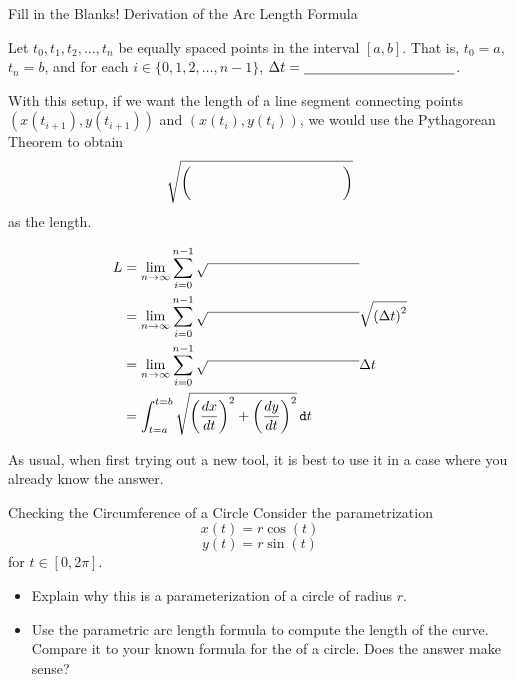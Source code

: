 \begin{exercise}{Fill in the Blanks!  Derivation of the Arc Length Formula \Coffeecup \Coffeecup}

Let $t_0,t_1,t_2,\ldots,t_n$ be equally spaced points in the interval $[a,b]$.  That is, $t_0=a$, $t_n=b$, and for each $i\in\lbrace 0,1,2,\ldots , n-1 \rbrace$, $\Delta t = \underline{\hspace{1.5in}}$.

With this setup, if we want the length of a line segment connecting points $\left(x\left(t_{i+1}\right),y\left(t_{i+1}\right)\right)$ and $\left(x\left(t_{i}\right),y\left(t_{i}\right)\right)$, we would use the Pythagorean Theorem to obtain 
$$\sqrt{ \binom{\hspace{1.5in}}{\hspace{1.5in}} } $$ as the length.

\begin{align*}
L&=\lim_{n\rightarrow \infty}\sum_{i=0}^{n-1} \sqrt{\hspace{1.5in}} \\
&=\lim_{n\rightarrow \infty}\sum_{i=0}^{n-1} \sqrt{\hspace{1.5in}} \sqrt{\left(\Delta t\right)^2} \\
&=\lim_{n\rightarrow \infty}\sum_{i=0}^{n-1} \sqrt{\hspace{1.5in} } \Delta t \\
&=\int_{t=a}^{t=b} \sqrt{\left(\frac{dx}{dt}\right)^2+\left(\frac{dy}{dt}\right)^2 } \mathop{}\!\mathtt{d} t
\end{align*}
\end{exercise}

As usual, when first trying out a new tool, it is best to use it in a case where you already know the answer.

\begin{exercise}{Checking the Circumference of a Circle \Coffeecup \Coffeecup}  Consider the parametrization
$$ x(t)=r\cos(t)$$
$$ y(t)=r\sin(t)$$
for $t\in [0,2\pi]$.
\begin{itemize}
\item Explain why this is a parameterization of a circle of radius $r$.  
\vspace*{1in}
\item Use the parametric arc length formula to compute the length of the curve.  Compare it to your known formula for the  of a circle.  Does the answer make sense?
\vspace*{2in}
\end{itemize}
\end{exercise}

